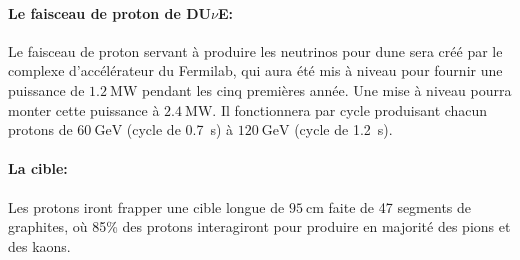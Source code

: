 	         \paragraph{Le faisceau de proton de DU$\nu$E:} Le faisceau de proton servant à produire les neutrinos pour \gls{dune} sera créé par le complexe d'accélérateur du Fermilab, qui aura été mis à niveau pour fournir une puissance de $\SI{1.2}{\mega\watt}$ pendant les cinq premières année. Une mise à niveau pourra monter cette puissance à $\SI{2.4}{\mega\watt}$. Il fonctionnera par cycle produisant chacun  protons de $\SI{60}{\giga\electronvolt}$ (cycle de \SI{0.7}{\second})  à $\SI{120}{\giga\electronvolt}$ (cycle de \SI{1.2}{\second}). 
	         
	         \paragraph{La cible:} Les protons iront frapper une cible longue de $\SI{95}{\centi\meter}$ faite de 47 segments de graphites, où 85\;\% des protons interagiront pour produire en majorité des pions et des kaons. 
	         
